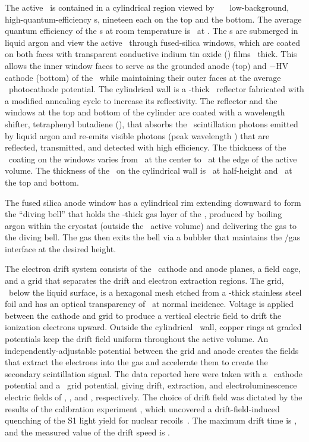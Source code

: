 The active \lar\ is contained in a cylindrical region viewed by \dsfpmtnum\ \dsfpmt\ \dsfpmtsize\ low-background, high-quantum-efficiency  {\pmt s}, nineteen each on the top and the bottom.  The average quantum efficiency of the {\pmt s} at room temperature is \dsfpmtqe\ at \dsfpmtwave.  The  {\pmt s} are submerged in liquid argon and view the active \lar\ through fused-silica windows, which are coated on both faces with transparent conductive indium tin oxide (\ito) films \dsfitothickness\ thick.  This allows the inner window faces to serve as the grounded anode (top) and $-$HV cathode (bottom) of the \tpc\ while maintaining their outer faces at the average \pmt\ photocathode potential.  The cylindrical wall is a \dsfthickptfereplector-thick \ptfe\ reflector fabricated with a modified annealing cycle  to increase its reflectivity.  The reflector and the windows at the top and bottom of the cylinder are coated with a wavelength shifter, tetraphenyl butadiene (\tpb), that absorbs the \arwave\ scintillation photons emitted by liquid argon and re-emits visible photons (peak wavelength \dsfpmtwave) that are reflected, transmitted, and detected with high efficiency.  The thickness of the \tpb\ coating on the windows varies from \dsftpbcenterthickness\ at the center to \dsftpbedgethickness\ at the edge of the active volume.  The thickness of the \tpb\ on the cylindrical wall is \dsftpbwallhalfthickness\ at half-height and \dsftpbwallbottomthickness\ at the top and bottom.

The fused silica anode window has a cylindrical rim extending downward to form the ``diving bell'' that holds the \dsfgaspocketthickness-thick gas layer of the \tpc, produced by boiling argon within the cryostat (outside the \tpc\ active volume) and delivering the gas to the diving bell.  The gas then exits the bell via a bubbler that maintains the \lar/gas interface at the desired height.

The electron drift system consists of the \ito\ cathode and anode planes, a field cage, and a grid that separates the drift and electron extraction regions.  The grid, \dsflarovergrid\ below the liquid surface, is a hexagonal mesh etched from a \dsfgridfoil-thick stainless steel foil and has an optical transparency of \dsfgridfoiltrasparency\ at normal incidence.  
Voltage is applied between the cathode and grid to produce a vertical electric field to drift the ionization electrons upward.  Outside the cylindrical \ptfe\ wall, copper rings at graded potentials keep the drift field uniform throughout the active volume.  An independently-adjustable potential between the grid and anode creates the fields that extract the electrons into the gas and accelerate them to create the secondary scintillation signal.  The data reported here were taken with a \dsfcathodepot\ cathode potential and a \dsfgridpot\ grid potential, giving drift, extraction, and electroluminescence electric fields of \dsfdriftfield, \dsfextractionfield, and \dsfmultfield, respectively.  The choice of drift field was dictated by the results of the calibration experiment \scene, which uncovered a drift-field-induced quenching of the S1 light yield for nuclear recoils~\cite{scene1,scene2}.  The maximum drift time is \dsftdriftmaxanal, and the measured value of the drift speed is \espeedbelowmesh.

